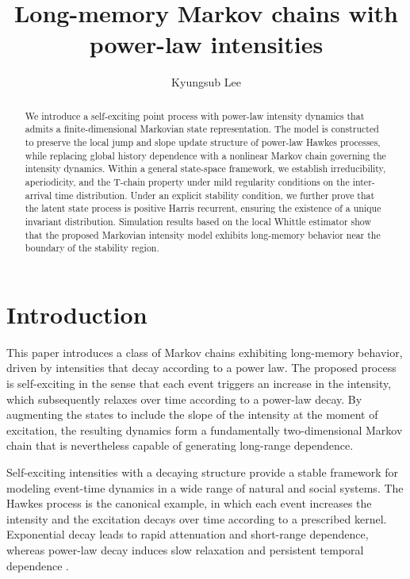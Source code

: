 \documentclass[11pt]{article}
\theoremstyle{definition}
\begin{document}
\title{Long-memory Markov chains with power-law intensities}

\author[1]{Kyungsub Lee}


\maketitle

\begin{abstract}
	We introduce a self-exciting point process with power-law intensity dynamics that admits a finite-dimensional Markovian state representation.
	The model is constructed to preserve the local jump and slope update structure of power-law Hawkes processes, while replacing global history dependence with a nonlinear Markov chain governing the intensity dynamics.
	Within a general state-space framework, we establish irreducibility, aperiodicity, and the T-chain property under mild regularity conditions on the inter-arrival time distribution.
	Under an explicit stability condition, we further prove that the latent state process is positive Harris recurrent, ensuring the existence of a unique invariant distribution.
	Simulation results based on the local Whittle estimator show that the proposed Markovian intensity model exhibits long-memory behavior near the boundary of the stability region.
\end{abstract}

\section{Introduction}

This paper introduces a class of Markov chains exhibiting long-memory behavior, driven by intensities that decay according to a power law. 
The proposed process is self-exciting in the sense that each event triggers an increase in the intensity, which subsequently relaxes over time according to a power-law decay. 
By augmenting the states to include the slope of the intensity at the moment of excitation, the resulting dynamics form a fundamentally two-dimensional Markov chain that is nevertheless capable of generating long-range dependence.

Self-exciting intensities with a decaying structure provide a stable framework for modeling event-time dynamics in a wide range of natural and social systems.
The Hawkes process \citep{Hawkes1, Hawkes2} is the canonical example, in which each event increases the intensity and the excitation decays over time according to a prescribed kernel.
Exponential decay leads to rapid attenuation and short-range dependence, whereas power-law decay induces slow relaxation and persistent temporal dependence \citep{hardiman2013critical, bacry2016estimation, zhang2016modeling, nystrom2022hawkes}.
\end{document}
